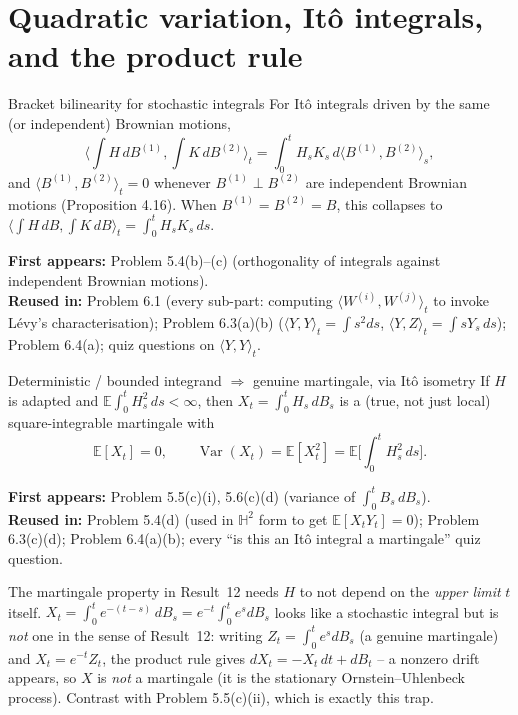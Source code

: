 \documentclass[11pt]{article}
\newcommand{\E}{\mathbb{E}}
\DeclareMathOperator{\Var}{Var}
\newcommand{\br}[1]{\langle #1\rangle}
\newcommand{\used}[2]{\begin{sourcebox}\textbf{First appears:} #1 \\ \textbf{Reused in:} #2\end{sourcebox}}
\begin{document}
\section{Quadratic variation, Itô integrals, and the product rule}

\begin{result}{Bracket bilinearity for stochastic integrals}
\label{res:11}
For Itô integrals driven by the same (or independent) Brownian motions,
\[
\Big\langle\!\int H\,dB^{(1)},\int K\,dB^{(2)}\Big\rangle_t
=\int_0^t H_sK_s\,d\br{B^{(1)},B^{(2)}}_s,
\]
and $\br{B^{(1)},B^{(2)}}_t=0$ whenever $B^{(1)}\perp B^{(2)}$ are independent
Brownian motions (Proposition 4.16). When $B^{(1)}=B^{(2)}=B$, this collapses to
$\br{\int H\,dB,\int K\,dB}_t=\int_0^t H_sK_s\,ds$.
\end{result}
\used{Problem 5.4(b)--(c) (orthogonality of integrals against independent
Brownian motions).}{Problem 6.1 (every sub-part: computing $\br{W^{(i)},W^{(j)}}_t$
to invoke Lévy's characterisation); Problem 6.3(a)(b) ($\br{Y,Y}_t=\int s^2ds$,
$\br{Y,Z}_t=\int sY_s\,ds$); Problem 6.4(a); quiz questions on $\br{Y,Y}_t$.}

\begin{result}{Deterministic / bounded integrand $\Rightarrow$ genuine
martingale, via Itô isometry}
\label{res:12}
If $H$ is adapted and $\E\int_0^t H_s^2\,ds<\infty$, then $X_t=\int_0^t H_s\,dB_s$
is a (true, not just local) square-integrable martingale with
\[
\E[X_t]=0,\qquad \Var(X_t)=\E[X_t^2]=\E\Big[\int_0^t H_s^2\,ds\Big].
\]
\end{result}
\used{Problem 5.5(c)(i), 5.6(c)(d) (variance of $\int_0^tB_s\,dB_s$).}{Problem
5.4(d) (used in $\mathbb H^2$ form to get $\E[X_tY_t]=0$); Problem 6.3(c)(d);
Problem 6.4(a)(b); every ``is this an Itô integral a martingale'' quiz question.}

\begin{trap}
The martingale property in Result~12 needs $H$ to not depend on the \emph{upper
limit} $t$ itself. $X_t=\int_0^te^{-(t-s)}\,dB_s=e^{-t}\int_0^te^sdB_s$ looks like
a stochastic integral but is \emph{not} one in the sense of Result~12: writing
$Z_t=\int_0^te^sdB_s$ (a genuine martingale) and $X_t=e^{-t}Z_t$, the product rule
gives $dX_t=-X_t\,dt+dB_t$ -- a nonzero drift appears, so $X$ is \emph{not} a
martingale (it is the stationary Ornstein--Uhlenbeck process). Contrast with
Problem 5.5(c)(ii), which is exactly this trap.
\end{trap}
\end{document}
